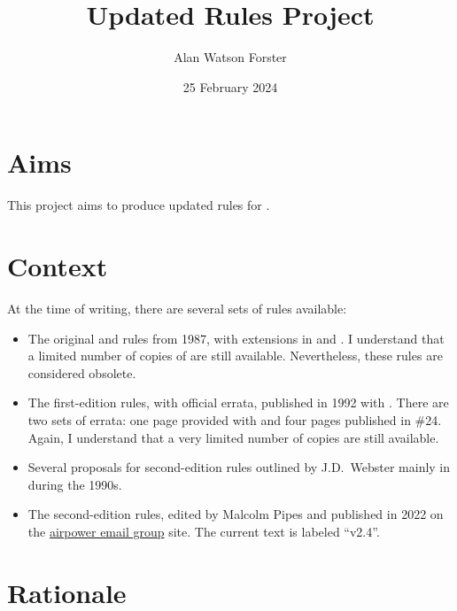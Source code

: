 \documentclass[10pt]{article}
\title{Updated Rules Project}
\author{Alan Watson Forster}
\date{25 February 2024}
\begin{document}
\twocolumn
\thispagestyle{empty}
\maketitle
\suppressfloats

\section*{Aims}

This project aims to produce updated rules for {\AirPow}.

\section*{Context}

At the time of writing, there are several sets of rules available:
\begin{itemize}
    \item The original {\AirSup} and {\AirStr} rules from 1987, with extensions in {\DF} and {\EOTG}. I understand that a limited number of copies of {\AirSup} are still available. Nevertheless, these rules are considered obsolete.
    \item The first-edition {\AirPow} rules, with official errata, published in 1992 with {\TSOH}. There are two sets of errata: one page provided with {\TSOH} and four pages published in {\APJ} \#24. Again, I understand that a very limited number of copies are still available.
    \item Several proposals for second-edition rules outlined by J.D.\ Webster mainly in {\APJ} during the 1990s.
    \item The second-edition {\AirPow} rules, edited by Malcolm Pipes and published in 2022 on the \href{https://airpower.groups.io/g/main}{airpower email group} site. The current text is labeled “v2.4”.
\end{itemize}

\section*{Rationale}
\end{document}
